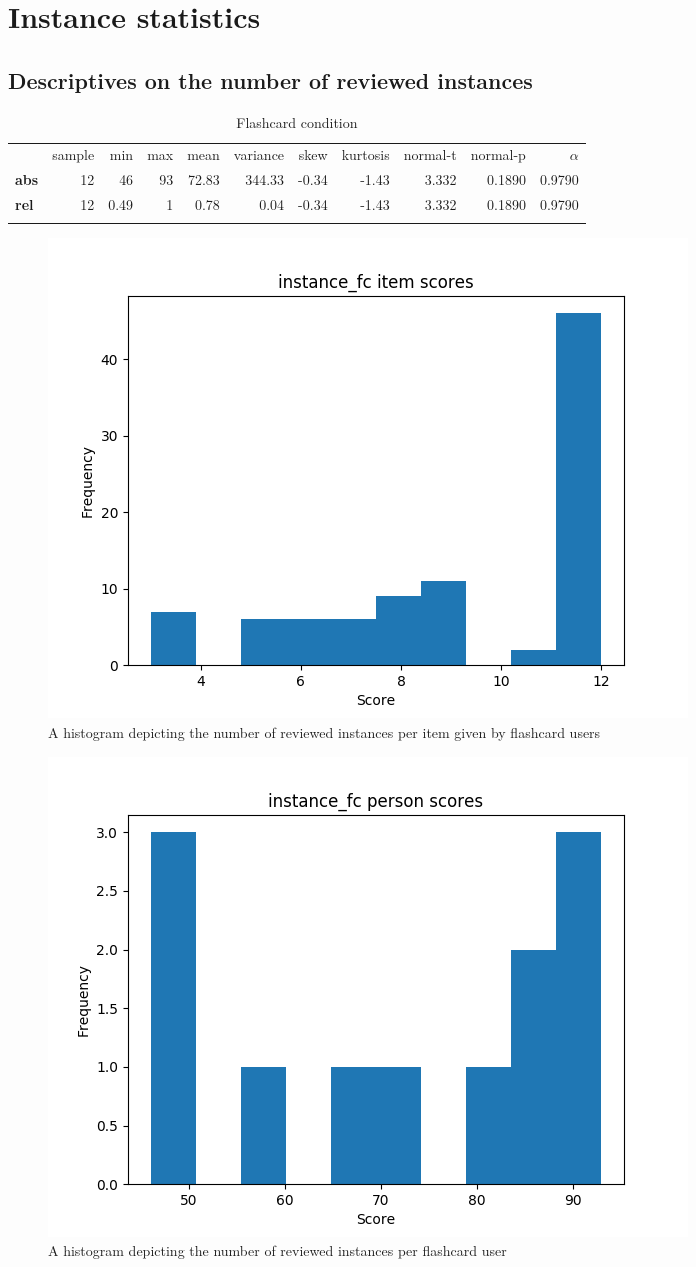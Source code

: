 \chapter{Instance statistics}
\label{app:instance_stats}

\FloatBarrier
\section{Descriptives on the number of reviewed instances}

\begin{longtable}[c]{@{}lrrrrrrrrrr@{}}
    \caption{Flashcard condition}
    \endfirsthead
    \endhead
\toprule\addlinespace
& sample & min & max & mean & variance & skew & kurtosis & normal-t &
normal-p & $\alpha$
\\\addlinespace
\midrule
\textbf{abs} & 12 & 46 & 93 & 72.83 & 344.33 & -0.34 & -1.43 & 3.332 &
0.1890 & 0.9790
\\\addlinespace
\textbf{rel} & 12 & 0.49 & 1 & 0.78 & 0.04 & -0.34 & -1.43 & 3.332 & 0.1890
& 0.9790
\\\addlinespace
\bottomrule
    \label{tab:instance_fc}
\end{longtable}

\begin{figure}
    \centering
    \includegraphics[width=.7\textwidth]{img/instance_fc_diff.png}
    \caption{A histogram depicting the number of reviewed instances per item given by flashcard users}
    \label{fig:instance_fc_diff}
\end{figure}
\begin{figure}
    \centering
    \includegraphics[width=.7\textwidth]{img/instance_fc_abil.png}
    \caption{A histogram depicting the number of reviewed instances per flashcard user}
    \label{fig:instance_fc_abil}
\end{figure}

